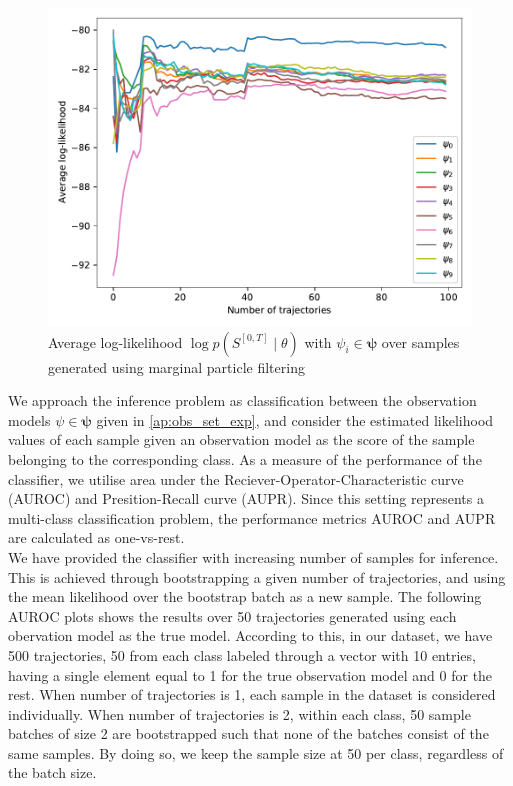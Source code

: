 \begin{figure}[H]
	\begin{center}
		\includegraphics[width=.7\textwidth]{figures/roc_analysis/roc_particleFilter/llh_particleFilter_psi_0}
		\caption[Average log-likelihood in the case of marginal particle filtering]{Average log-likelihood $ \log p(S^{[0,T]} \mid \theta) $ with $ \psi_i \in \symbf{\psi} $ over samples generated using marginal particle filtering}
		\label{fig:llh_particle}
	\end{center}
\end{figure}
\pagebreak
We approach the inference problem as classification between the observation models $ \psi \in \symbf{\psi} $ given in \cref{ap:obs_set_exp}, and consider the estimated likelihood values of each sample given an observation model as the score of the sample belonging to the corresponding class. As a measure of the performance of the classifier, we utilise area under the Reciever-Operator-Characteristic curve (AUROC) and Presition-Recall curve (AUPR). Since this setting represents a multi-class classification problem, the performance metrics AUROC and AUPR are calculated as one-vs-rest. \\ %
We have provided the classifier with increasing number of samples for inference. This is achieved through bootstrapping a given number of trajectories, and using the mean likelihood over the bootstrap batch as a new sample. The following AUROC plots shows the results over 50 trajectories generated using each obervation model as the true model. According to this, in our dataset, we have 500 trajectories, 50 from each class labeled through a vector with 10 entries, having a single element equal to 1 for the true observation model and 0 for the rest. When number of trajectories is 1, each sample in the dataset is considered individually. When number of trajectories is 2, within each class, 50 sample batches of size 2 are bootstrapped such that none of the batches consist of the same samples. By doing so, we keep the sample size at 50 per class, regardless of the batch size. \\
